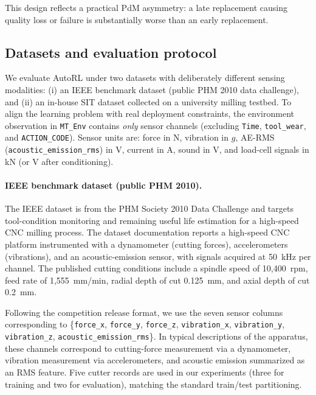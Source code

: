 \documentclass[sn-basic]{sn-jnl} %
\begin{document}
This design reflects a practical PdM asymmetry: a late replacement causing quality loss or failure is substantially worse than an early replacement.

\subsection{Datasets and evaluation protocol} \label{sec:experiment} 

We evaluate AutoRL under two datasets with deliberately different sensing modalities: (i) an IEEE benchmark dataset (public PHM 2010 data challenge), and (ii) an in-house SIT dataset collected on a university milling testbed. To align the learning problem with real deployment constraints, the environment observation in \texttt{MT\_Env} contains \emph{only} sensor channels (excluding \texttt{Time}, \texttt{tool\_wear}, and \texttt{ACTION\_CODE}). Sensor units are: force in N, vibration in $g$, AE-RMS (\texttt{acoustic\_emission\_rms}) in V, current in A, sound in V, and load-cell signals in kN (or V after conditioning).

\paragraph{IEEE benchmark dataset (public PHM 2010).}
The IEEE dataset \cite{PHMdata2010} is from the PHM Society 2010 Data Challenge and targets tool-condition monitoring and remaining useful life estimation for a high-speed CNC milling process. The dataset documentation reports a high-speed CNC platform instrumented with a dynamometer (cutting forces), accelerometers (vibrations), and an acoustic-emission sensor, with signals acquired at 50~kHz per channel. The published cutting conditions include a spindle speed of 10{,}400~rpm, feed rate of 1{,}555~mm/min, radial depth of cut 0.125~mm, and axial depth of cut 0.2~mm.

Following the competition release format, we use the seven sensor columns corresponding to \{\texttt{force\_x}, \texttt{force\_y}, \texttt{force\_z}, \texttt{vibration\_x}, \texttt{vibration\_y}, \texttt{vibration\_z}, \texttt{acoustic\_emission\_rms}\}. In typical descriptions of the apparatus, these channels correspond to cutting-force measurement via a dynamometer, vibration measurement via accelerometers, and acoustic emission summarized as an RMS feature. Five cutter records are used in our experiments (three for training and two for evaluation), matching the standard train/test partitioning.
\end{document}
